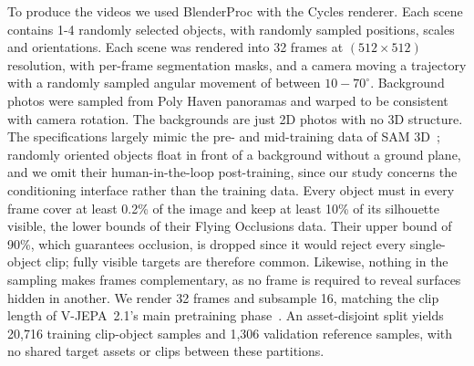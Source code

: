 \documentclass{article}
\begin{document}
To produce the videos we used BlenderProc \cite{denninger2023blenderproc} with the Cycles renderer. Each scene contains 1-4 randomly selected objects, with randomly sampled positions, scales and orientations. 
Each scene was rendered into 32 frames at  $(512\times 512)$ resolution, with
per-frame segmentation masks, and a camera moving a trajectory with a randomly
sampled angular movement of between $10-70^\circ$.
Background photos were sampled from Poly Haven panoramas \cite{polyhaven} and warped to be consistent with camera rotation. The backgrounds are just 2D photos with no 3D structure. \\


The specifications largely mimic the pre- and mid-training data of SAM 3D~\cite{sam3d};
randomly oriented objects float in front of a background without a ground plane,
and we omit their human-in-the-loop post-training,
since our study concerns the conditioning interface rather than the training data.
Every object must in every frame cover at least 0.2\% of the image and keep at least 10\% of its silhouette visible,
the lower bounds of their Flying Occlusions data.
Their upper bound of 90\%, which guarantees occlusion, 
is dropped since it would reject every single-object clip; fully visible targets are therefore common.
Likewise, nothing in the sampling makes frames complementary,
as no frame is required to reveal surfaces hidden in another.
We render 32 frames and subsample 16, matching the clip length of V-JEPA~2.1's main pretraining phase~\cite{vjepa21}.
An asset-disjoint split yields 20,716 training clip-object samples and 1,306
validation reference samples, with no shared target assets or clips between
these partitions.
\end{document}
